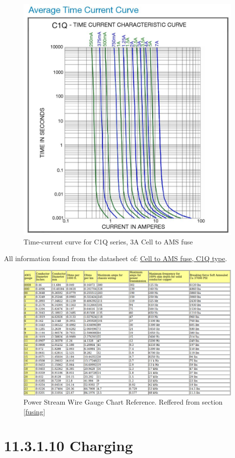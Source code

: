\documentclass{article}
\begin{document}
{\begin{figure}[H]
    \centering
    \includegraphics[width = 0.6 \textwidth]{amsfusecurve}
    \caption{Time-current curve for C1Q series, 3A Cell to AMS fuse}
    \label{amsfusecurve}
\end{figure}

All information found from the datasheet of:
\href{http://belfuse.com/pdfs/C1Q.pdf}{Cell to AMS fuse, C1Q type}.


\begin{figure}
    \centering
    \includegraphics[width = 1 \textwidth]{WireGaugeChart}
    \caption{Power Stream Wire Gauge Chart Reference. Reffered from section \ref{fusing}}
    \label{AWGchart}
\end{figure}

\section*{11.3.1.10 Charging}

}
\end{document}
